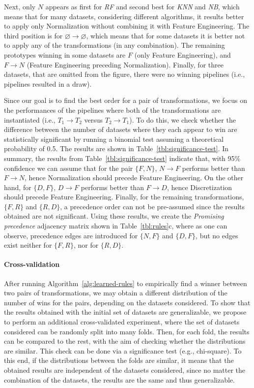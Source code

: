 \begin{example}
Next, only $N$ appears as first for \textit{RF} and second best for \textit{KNN} and \textit{NB}, which means that for many datasets, considering different algorithms, it results better to apply only Normalization without combining it with Feature Engineering. The third position is for $\varnothing\rightarrow \varnothing$, which means that for some datasets it is better not to apply any of the transformations (in any combination). The remaining prototypes winning in some datasets are $F$ (only Feature Engineering), and $F \rightarrow N$ (Feature Engineering preceding Normalization).  Finally, for three datasets, that are omitted from the figure, there were no winning pipelines (i.e., pipelines resulted in a draw).

Since our goal is to find the best order for a pair of transformations, we focus on the performances of the pipelines where both of the transformations are instantiated (i.e., $T_1\rightarrow T_2$ versus $T_2\rightarrow T_1$). To do this, we check whether the difference between the number of datasets where they each appear to win are statistically significant by running a binomial test assuming a theoretical probability of 0.5. The results are shown in Table~\ref{tbl:significance-test}.
In summary, the results from Table~\ref{tbl:significance-test} indicate that, with 95\% confidence we can assume that for the pair $\{F,N\}$, $N\rightarrow F$ performs better than $F\rightarrow N$, hence Normalization should precede Feature Engineering. On the other hand, for $\{D,F\}$, $D\rightarrow F$ performs better than $F\rightarrow D$, hence Discretization should precede Feature Engineering. Finally, for the remaining transformations, $\{F,R\}$ and $\{R,D\}$, a precedence order can not be pre-assumed since the results obtained are not significant. 
Using these results, we create the \textit{Promising precedence} adjacency matrix shown in Table~\ref{tbl:rules}c, where as one can observe, precedence edges are introduced for $\{N,F\}$ and $\{D,F\}$, but no edges exist neither for $\{F,R\}$, nor for $\{R,D\}$. 
\end{example}

\paragraph{Cross-validation}
\label{ssec:learned-rules-validation}
After running Algorithm~\ref{alg:learned-rules} to empirically find a winner between two pairs of transformations, we may obtain a different distribution of the number of wins for the pairs, depending on the datasets considered. To show that the results obtained with the initial set of datasets are generalizable, we propose to perform an additional cross-validated experiment, where the set of datasets considered can be randomly split into many folds. Then, for each fold, the results can be compared to the rest, with the aim of checking whether the distributions are similar. This check can be done via a significance test (e.g., chi-square). To this end, if the distributions between the folds are similar, it means that the obtained results are independent of the datasets considered, since no matter the combination of the datasets, the results are the same and thus generalizable.


